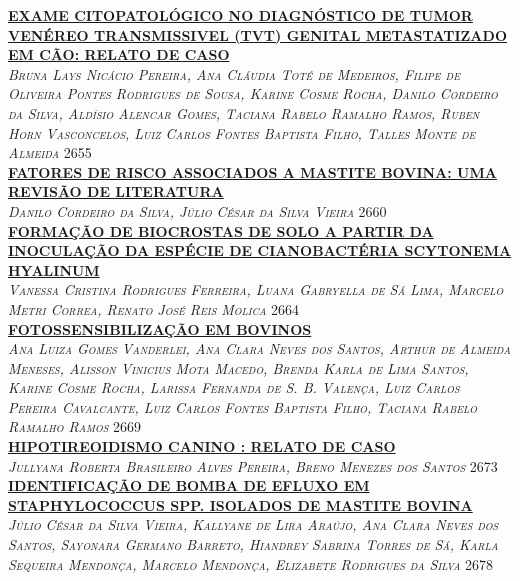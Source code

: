 \noindent \textsc{\hyperlink{trabalhos/251609.pdf.1}{\textbf{EXAME CITOPATOLÓGICO NO DIAGNÓSTICO DE TUMOR VENÉREO TRANSMISSIVEL (TVT) GENITAL METASTATIZADO EM CÃO: RELATO DE CASO }}}\\ 
\noindent \textsc{\textit{Bruna Lays Nicácio Pereira, Ana Cláudia Toté de Medeiros, Filipe de Oliveira Pontes Rodrigues de Sousa, Karine Cosme Rocha, Danilo Cordeiro da Silva, Aldísio Alencar Gomes, Taciana Rabelo Ramalho Ramos, Ruben Horn Vasconcelos, Luiz Carlos Fontes Baptista Filho, Talles Monte de Almeida}} \hfill 2655\\ 

\noindent \textsc{\hyperlink{trabalhos/251662.pdf.1}{\textbf{FATORES DE RISCO ASSOCIADOS A MASTITE BOVINA: UMA REVISÃO DE LITERATURA}}}\\ 
\noindent \textsc{\textit{Danilo Cordeiro da Silva, Júlio César da Silva Vieira}} \hfill 2660\\ 

\noindent \textsc{\hyperlink{trabalhos/251770.pdf.1}{\textbf{FORMAÇÃO DE BIOCROSTAS DE SOLO A PARTIR DA INOCULAÇÃO DA ESPÉCIE DE CIANOBACTÉRIA SCYTONEMA HYALINUM}}}\\ 
\noindent \textsc{\textit{Vanessa Cristina Rodrigues Ferreira, Luana Gabryella de Sá Lima, Marcelo Metri Correa, Renato José Reis Molica}} \hfill 2664\\ 

\noindent \textsc{\hyperlink{trabalhos/251958.pdf.1}{\textbf{FOTOSSENSIBILIZAÇÃO EM BOVINOS }}}\\ 
\noindent \textsc{\textit{Ana Luiza Gomes Vanderlei, Ana Clara Neves dos Santos, Arthur de Almeida Meneses, Alisson Vinicius Mota Macedo, Brenda Karla de Lima Santos, Karine Cosme Rocha, Larissa Fernanda de S. B. Valença, Luiz Carlos Pereira Cavalcante, Luiz Carlos Fontes Baptista Filho, Taciana Rabelo Ramalho Ramos}} \hfill 2669\\ 

\noindent \textsc{\hyperlink{trabalhos/246698.pdf.1}{\textbf{HIPOTIREOIDISMO CANINO : RELATO DE CASO}}}\\ 
\noindent \textsc{\textit{Jullyana Roberta Brasileiro Alves Pereira, Breno Menezes dos Santos}} \hfill 2673\\ 

\noindent \textsc{\hyperlink{trabalhos/251368.pdf.1}{\textbf{IDENTIFICAÇÃO DE BOMBA DE EFLUXO EM STAPHYLOCOCCUS SPP. ISOLADOS DE MASTITE BOVINA }}}\\ 
\noindent \textsc{\textit{Júlio César da Silva Vieira, Kallyane de Lira Araújo, Ana Clara Neves dos Santos, Sayonara Germano Barreto, Hiandrey Sabrina Torres de Sá, Karla Sequeira Mendonça, Marcelo Mendonça, Elizabete Rodrigues da Silva}} \hfill 2678\\ 

